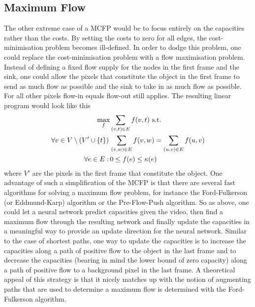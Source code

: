 \documentclass{article}
\begin{document}
\subsection{Maximum Flow}
The other extreme case of a MCFP would be to focus entirely on the capacities rather than the costs. By setting the costs to zero for all edges, the cost-minimisation problem becomes ill-defined. In order to dodge this problem, one could replace the cost-minimisation problem with a flow maximisation problem. Instead of defining a fixed flow supply for the nodes in the first frame and the sink, one could allow the pixels that constitute the object in the first frame to send as much flow as possible and the sink to take in as much flow as possible. For all other pixels flow-in equals flow-out still applies. The resulting linear program would look like this 
\begin{align}\label{MFP}
\max_f &\sum_{(v,t) \in E} f(v,t) \textnormal{ s.t.}\nonumber\\
\forall v \in V\setminus\left(V' \cup \{ t\}\right) \, & \sum_{(v,w) \in E} f(v,w) = \sum_{(u,v) \in E} f(u,v) \\
\forall	e \in E: \, & 0 \leq f(e) \leq \kappa(e) \nonumber
\end{align} 
where $V'$ are the pixels in the first frame that constitute the object. One advantage of such a simplification of the MCFP is that there are several fast algorithms for solving a maximum flow problem, for instance the Ford-Fulkerson (or Eddmund-Karp) algorithm or the Pre-Flow-Push algorithm. So as above, one could let a neural network predict capacities given the video, then find a maximum flow through the resulting network and finally update the capacities in a meaningful way to provide an update direction for the neural network. Similar to the case of shortest paths, one way to update the capacities is to increase the capacities along a path of positive flow to the object in the last frame and to decrease the capacities (bearing in mind the lower bound of zero capacity) along a path of positive flow to a background pixel in the last frame. A theoretical appeal of this strategy is that it nicely matches up with the notion of augmenting paths that are used to determine a maximum flow is determined with the Ford-Fulkerson algorithm.\\
\end{document}
